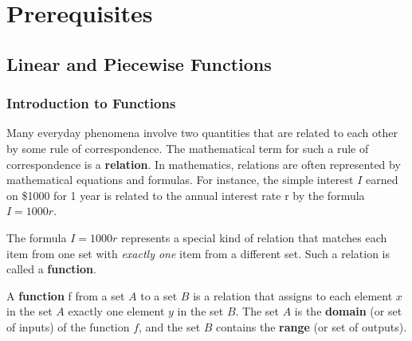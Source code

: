 \documentclass[11pt,fleqn,openany]{book} %
\begin{document}
{} %
\pagestyle{empty} %
\tableofcontents %
\pagestyle{fancy} %







\part{Prerequisites}




\chapter{Linear and Piecewise Functions}

\section{Introduction to Functions}

Many everyday phenomena involve two quantities that are related to 
each other by some rule of correspondence. The mathematical term for 
such a rule of correspondence is a \textbf{relation}. In mathematics, 
relations are often represented by mathematical equations and formulas. 
For instance, the simple interest $I$ earned on \$1000 for 1 year is 
related to the annual interest rate r by the formula $I = 1000r$.

The formula $I = 1000r$ represents a special kind of relation that 
matches each item from one set with \textit{exactly one} item from a 
different set. Such a relation is called a \textbf{function}.

\begin{definition}[Function]
A \textbf{function} f from a set $A$ to a set $B$ is a relation that 
assigns to each element $x$ in the set $A$ exactly one element $y$ 
in the set $B$. The set $A$ is the \textbf{domain} (or set of inputs) 
of the function $f$, and the set $B$ contains the \textbf{range} 
(or set of outputs).
\end{definition}
\end{document}
